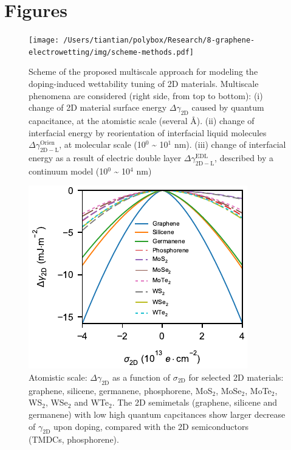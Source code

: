 \documentclass[journal=ancac3,manuscript=article,email=true,hyperref=true,keywords=true]{achemso}
\begin{document}


\newpage{}
\section{Figures}
\label{sec:org5261a93}



\begin{figure}[htbp]
\centering
\texttt{[image: /Users/tiantian/polybox/Research/8-graphene-electrowetting/img/scheme-methods.pdf]}
\caption{\label{fig:scheme-method}
Scheme of the proposed multiscale approach for modeling the doping-induced wettability tuning of 2D materials. Multiscale phenomena are considered (right side, from top to bottom): (i) change of 2D material surface energy \(\Delta \gamma_{\mathrm{2D}}\) caused by quantum capacitance, at the atomistic scale (several \AA{}). (ii) change of interfacial energy by reorientation of interfacial liquid molecules  \(\Delta \gamma_{\mathrm{2D-L}} ^{\mathrm{Orien}}\), at molecular scale (10\(^{\text{0}}\) \textasciitilde{} 10\(^{\text{1}}\) nm). (iii) change of interfacial energy as a result of electric double layer  \(\Delta \gamma_{\mathrm{2D-L}} ^{\mathrm{EDL}}\), described by a continuum model (10\(^{\text{0}}\) \textasciitilde{} 10\(^{\text{4}}\) nm)}
\end{figure}


\begin{figure}[htbp]
\centering
\includegraphics[width=0.75\linewidth]{../img/dgamma-sigma.pdf}
\caption{\label{fig:dgamma-sigma}
Atomistic scale: \(\Delta \gamma_{\mathrm{2D}}\) as a function of \(\sigma_{\mathrm{2D}}\) for selected 2D materials: graphene, silicene, germanene, phosphorene, MoS\(_{2}\), MoSe\(_{2}\), MoTe\(_{2}\), WS\(_{2}\), WSe\(_{2}\) and WTe\(_{2}\). The 2D semimetals (graphene, silicene and germanene) with low high quantum capcitances show larger decrease of \(\gamma_{\mathrm{2D}}\) upon doping, compared with the 2D semiconductors (TMDCs, phosphorene).}
\end{figure}
\end{document}
